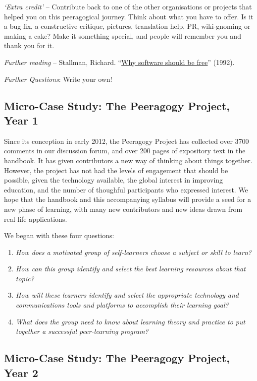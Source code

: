 \emph{`Extra credit'} -- Contribute back to one of the other
organisations or projects that helped you on this peeragogical journey.
Think about what you have to offer. Is it a bug fix, a constructive
critique, pictures, translation help, PR, wiki-gnoming or making a cake?
Make it something special, and people will remember you and thank you
for it.

\emph{Further reading} -- Stallman, Richard.
``\href{http://www.gnu.org/philosophy/shouldbefree.html}{Why software
should be free}'' (1992).

\emph{Further Questions}: Write your own!

\subsection{{\small {Micro-}Case Study: The Peeragogy Project, Year
1}}\label{micro-case-study-the-peeragogy-project-year-1}

Since its conception in early 2012, the Peeragogy Project has collected
over 3700 comments in our discussion forum, and over 200 pages of
expository text in the handbook. It has given contributors a new way of
thinking about things together. However, the project has not had the
levels of engagement that should be possible, given the technology
available, the global interest in improving education, and the number of
thoughful participants who expressed interest. We hope that the handbook
and this accompanying syllabus will provide a seed for a new phase of
learning, with many new contributors and new ideas drawn from real-life
applications.

We began with these four questions:

\begin{enumerate}
\def\labelenumi{\arabic{enumi}.}
\item
  \emph{How does a motivated group of self-learners choose a subject or
  skill to learn?}
\item
  \emph{How can this group identify and select the best learning
  resources about that topic?}
\item
  \emph{How will these learners identify and select the appropriate
  technology and communications tools and platforms to accomplish their
  learning goal?}
\item
  \emph{What does the group need to know about learning theory and
  practice to put together a successful peer-learning program?}
\end{enumerate}

\subsection{{\small {Micro-}Case Study: The Peeragogy Project, Year
2}}\label{micro-case-study-the-peeragogy-project-year-2}

